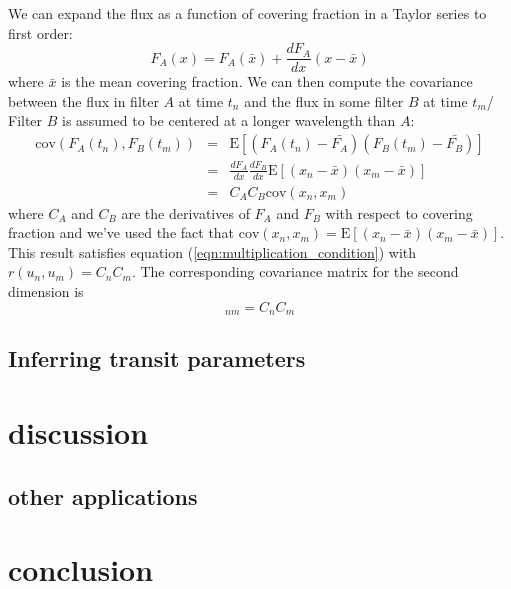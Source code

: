 \documentclass[preprint2]{aastex62}
\begin{document}
        We can expand the flux as a function of covering 
        fraction in a Taylor series to first order: 
        \begin{equation}
            F_A(x) = F_A(\bar{x}) + \frac{dF_A}{dx}(x-\bar{x})
        \end{equation}
        where $\bar{x}$ is the mean covering fraction. We can then compute the covariance between the flux in filter $A$ at time $t_n$ and the flux in some filter $B$ at time $t_m$/ 
        Filter $B$ is assumed to be centered at a longer wavelength than $A$:
        \begin{eqnarray}
            \nonumber \mathrm{cov}(F_A(t_n), F_B(t_m)) &=& \mathrm{E}\left[(F_A(t_n) - \bar{F_A})(F_B(t_m)-\bar{F_B})\right] \\
            \nonumber &=& \frac{dF_A}{dx}\frac{dF_B}{dx}\mathrm{E}\left[(x_n-\bar{x})(x_m-\bar{x})\right] \\
            &=& C_AC_B\mathrm{cov}(x_n, x_m)
        \end{eqnarray}
        where $C_A$ and $C_B$ are the derivatives of $F_A$ and $F_B$ with respect to 
        covering fraction and we've used the fact that $\mathrm{cov}(x_n, x_m) = \mathrm{E}\left[(x_n-\bar{x})(x_m-\bar{x})\right]$. 
        This result satisfies equation (\ref{eqn:multiplication_condition}) with $r(u_n, u_m) = C_nC_m$. The 
        corresponding covariance matrix for the second dimension is 
        \begin{equation}
            [R]_{nm} = C_nC_m
        \end{equation}
    \subsection{Inferring transit parameters}
        

\section{discussion}
	\subsection{other applications}

\section{conclusion}
\end{document}
